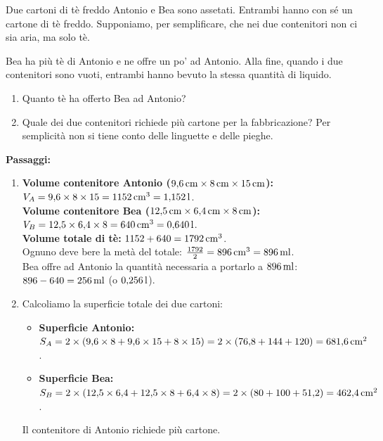 \begin{esercizio}{Due cartoni di tè freddo}
Antonio e Bea sono assetati. Entrambi hanno con sé un cartone di tè freddo. Supponiamo, per semplificare, che nei due contenitori non ci sia aria, ma solo tè.

Bea ha più tè di Antonio e ne offre un po' ad Antonio. Alla fine, quando i due contenitori sono vuoti, entrambi hanno bevuto la stessa quantità di liquido.


\begin{enumerate}[label=\roman*)]
  \item Quanto tè ha offerto Bea ad Antonio?
  \item Quale dei due contenitori richiede più cartone per la fabbricazione? Per semplicità non si tiene conto delle linguette e delle pieghe.
\end{enumerate}

\responsespace{2.8cm}

\begin{soluzione}
  \textbf{Passaggi:}
  \begin{enumerate}[label=\roman*)]
    \item \textbf{Volume contenitore Antonio ($9{,}6\,\mathrm{cm} \times 8\,\mathrm{cm} \times 15\,\mathrm{cm}$):}\\
    $V_A = 9{,}6 \times 8 \times 15 = 1152\,\mathrm{cm^3} = 1{,}152\,\mathrm{l}$.\\
    \textbf{Volume contenitore Bea ($12{,}5\,\mathrm{cm} \times 6{,}4\,\mathrm{cm} \times 8\,\mathrm{cm}$):}\\
    $V_B = 12{,}5 \times 6{,}4 \times 8 = 640\,\mathrm{cm^3} = 0{,}640\,\mathrm{l}$.\\
    \textbf{Volume totale di tè:} $1152 + 640 = 1792\,\mathrm{cm^3}$.\\
    Ognuno deve bere la metà del totale: $\frac{1792}{2} = 896\,\mathrm{cm^3} = 896\,\mathrm{ml}$.\\
    Bea offre ad Antonio la quantità necessaria a portarlo a $896\,\mathrm{ml}$: $896 - 640 = 256\,\mathrm{ml}$ (o $0{,}256\,\mathrm{l}$).
    \item Calcoliamo la superficie totale dei due cartoni:
    \begin{itemize}
      \item \textbf{Superficie Antonio:} $S_A = 2 \times (9{,}6 \times 8 + 9{,}6 \times 15 + 8 \times 15) = 2 \times (76{,}8 + 144 + 120) = 681{,}6\,\mathrm{cm^2}$.
      \item \textbf{Superficie Bea:} $S_B = 2 \times (12{,}5 \times 6{,}4 + 12{,}5 \times 8 + 6{,}4 \times 8) = 2 \times (80 + 100 + 51{,}2) = 462{,}4\,\mathrm{cm^2}$.
    \end{itemize}
    Il contenitore di Antonio richiede più cartone.
  \end{enumerate}
\end{soluzione}
\end{esercizio}

